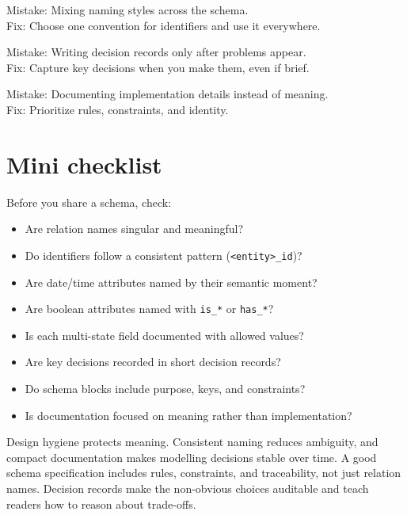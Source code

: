 Mistake: Mixing naming styles across the schema.\\
Fix: Choose one convention for identifiers and use it everywhere.

Mistake: Writing decision records only after problems appear.\\
Fix: Capture key decisions when you make them, even if brief.

Mistake: Documenting implementation details instead of meaning.\\
Fix: Prioritize rules, constraints, and identity.

\section{Mini checklist}
Before you share a schema, check:
\begin{itemize}[leftmargin=*,nosep]
  \item Are relation names singular and meaningful?
  \item Do identifiers follow a consistent pattern (\texttt{<entity>\_id})?
  \item Are date/time attributes named by their semantic moment?
  \item Are boolean attributes named with \texttt{is\_*} or \texttt{has\_*}?
  \item Is each multi-state field documented with allowed values?
  \item Are key decisions recorded in short decision records?
  \item Do schema blocks include purpose, keys, and constraints?
  \item Is documentation focused on meaning rather than implementation?
\end{itemize}

\begin{chaptersummary}
Design hygiene protects meaning.
Consistent naming reduces ambiguity, and compact documentation makes modelling decisions stable over time.
A good schema specification includes rules, constraints, and traceability, not just relation names.
Decision records make the non-obvious choices auditable and teach readers how to reason about trade-offs.
\end{chaptersummary}

